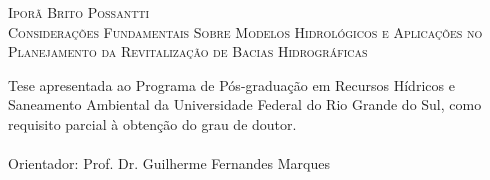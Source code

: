 \documentclass[./main.tex]{subfiles}
\begin{document}
\doublespacing %
\large

\newpage
\renewcommand{\headrulewidth}{0pt}
\thispagestyle{fancy}
\fancyhf{} %
\fancyfoot{} %
\fancyfoot[C]{\thepage}

\begin{center}
	\textsc{Iporã Brito Possantti}\\
	\vspace{30mm}
	\textsc{Considerações Fundamentais Sobre Modelos Hidrológicos e Aplicações no Planejamento da Revitalização de Bacias Hidrográficas}\\
	\vspace{30mm}
\end{center}
\begin{adjustwidth}{250pt}{0pt}
	\singlespacing
	Tese apresentada ao Programa de Pós-graduação em Recursos Hídricos e Saneamento Ambiental da Universidade Federal do Rio Grande do Sul, como requisito parcial à obtenção do grau de doutor. \\ \\ Orientador: Prof. Dr. Guilherme Fernandes Marques 
\end{adjustwidth}
\clearpage
\end{document}
